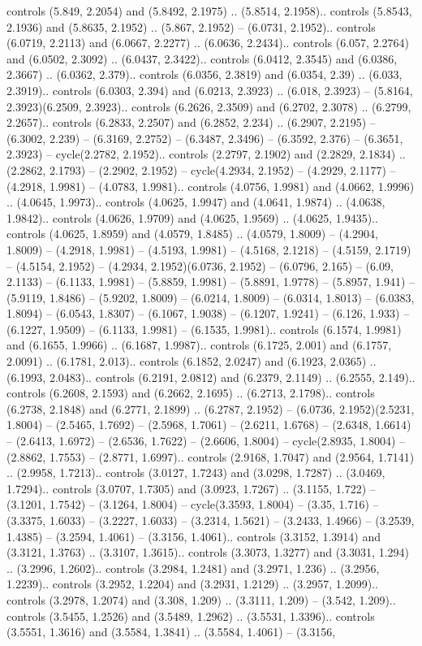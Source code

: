 controls (5.849, 2.2054) and (5.8492, 2.1975) .. (5.8514, 2.1958).. controls (5.8543, 2.1936) and (5.8635, 2.1952) .. (5.867, 2.1952) -- (6.0731, 2.1952).. controls (6.0719, 2.2113) and (6.0667, 2.2277) .. (6.0636, 2.2434).. controls (6.057, 2.2764) and (6.0502, 2.3092) .. (6.0437, 2.3422).. controls (6.0412, 2.3545) and (6.0386, 2.3667) .. (6.0362, 2.379).. controls (6.0356, 2.3819) and (6.0354, 2.39) .. (6.033, 2.3919).. controls (6.0303, 2.394) and (6.0213, 2.3923) .. (6.018, 2.3923) -- (5.8164, 2.3923)(6.2509, 2.3923).. controls (6.2626, 2.3509) and (6.2702, 2.3078) .. (6.2799, 2.2657).. controls (6.2833, 2.2507) and (6.2852, 2.234) .. (6.2907, 2.2195) -- (6.3002, 2.239) -- (6.3169, 2.2752) -- (6.3487, 2.3496) -- (6.3592, 2.376) -- (6.3651, 2.3923) -- cycle(2.2782, 2.1952).. controls (2.2797, 2.1902) and (2.2829, 2.1834) .. (2.2862, 2.1793) -- (2.2902, 2.1952) -- cycle(4.2934, 2.1952) -- (4.2929, 2.1177) -- (4.2918, 1.9981) -- (4.0783, 1.9981).. controls (4.0756, 1.9981) and (4.0662, 1.9996) .. (4.0645, 1.9973).. controls (4.0625, 1.9947) and (4.0641, 1.9874) .. (4.0638, 1.9842).. controls (4.0626, 1.9709) and (4.0625, 1.9569) .. (4.0625, 1.9435).. controls (4.0625, 1.8959) and (4.0579, 1.8485) .. (4.0579, 1.8009) -- (4.2904, 1.8009) -- (4.2918, 1.9981) -- (4.5193, 1.9981) -- (4.5168, 2.1218) -- (4.5159, 2.1719) -- (4.5154, 2.1952) -- (4.2934, 2.1952)(6.0736, 2.1952) -- (6.0796, 2.165) -- (6.09, 2.1133) -- (6.1133, 1.9981) -- (5.8859, 1.9981) -- (5.8891, 1.9778) -- (5.8957, 1.941) -- (5.9119, 1.8486) -- (5.9202, 1.8009) -- (6.0214, 1.8009) -- (6.0314, 1.8013) -- (6.0383, 1.8094) -- (6.0543, 1.8307) -- (6.1067, 1.9038) -- (6.1207, 1.9241) -- (6.126, 1.933) -- (6.1227, 1.9509) -- (6.1133, 1.9981) -- (6.1535, 1.9981).. controls (6.1574, 1.9981) and (6.1655, 1.9966) .. (6.1687, 1.9987).. controls (6.1725, 2.001) and (6.1757, 2.0091) .. (6.1781, 2.013).. controls (6.1852, 2.0247) and (6.1923, 2.0365) .. (6.1993, 2.0483).. controls (6.2191, 2.0812) and (6.2379, 2.1149) .. (6.2555, 2.149).. controls (6.2608, 2.1593) and (6.2662, 2.1695) .. (6.2713, 2.1798).. controls (6.2738, 2.1848) and (6.2771, 2.1899) .. (6.2787, 2.1952) -- (6.0736, 2.1952)(2.5231, 1.8004) -- (2.5465, 1.7692) -- (2.5968, 1.7061) -- (2.6211, 1.6768) -- (2.6348, 1.6614) -- (2.6413, 1.6972) -- (2.6536, 1.7622) -- (2.6606, 1.8004) -- cycle(2.8935, 1.8004) -- (2.8862, 1.7553) -- (2.8771, 1.6997).. controls (2.9168, 1.7047) and (2.9564, 1.7141) .. (2.9958, 1.7213).. controls (3.0127, 1.7243) and (3.0298, 1.7287) .. (3.0469, 1.7294).. controls (3.0707, 1.7305) and (3.0923, 1.7267) .. (3.1155, 1.722) -- (3.1201, 1.7542) -- (3.1264, 1.8004) -- cycle(3.3593, 1.8004) -- (3.35, 1.716) -- (3.3375, 1.6033) -- (3.2227, 1.6033) -- (3.2314, 1.5621) -- (3.2433, 1.4966) -- (3.2539, 1.4385) -- (3.2594, 1.4061) -- (3.3156, 1.4061).. controls (3.3152, 1.3914) and (3.3121, 1.3763) .. (3.3107, 1.3615).. controls (3.3073, 1.3277) and (3.3031, 1.294) .. (3.2996, 1.2602).. controls (3.2984, 1.2481) and (3.2971, 1.236) .. (3.2956, 1.2239).. controls (3.2952, 1.2204) and (3.2931, 1.2129) .. (3.2957, 1.2099).. controls (3.2978, 1.2074) and (3.308, 1.209) .. (3.3111, 1.209) -- (3.542, 1.209).. controls (3.5455, 1.2526) and (3.5489, 1.2962) .. (3.5531, 1.3396).. controls (3.5551, 1.3616) and (3.5584, 1.3841) .. (3.5584, 1.4061) -- (3.3156, 